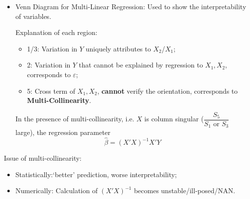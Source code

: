 \begin{itemize}[topsep=2pt,itemsep=2pt]
    \item Venn Diagram for Multi-Linear Regression: Used to show the interpretability of variables.
    
    \begin{center}
    \end{center}

    Explanation of each region:
    \begin{itemize}[topsep=2pt,itemsep=2pt]
        \item 1/3: Variation in $ Y $ uniquely attributes to $ X_2 $/$ X_1 $;
        \item 2: Variation in $ Y $ that cannot be explained by regression to $ X_1,X_2 $, corresponds to $ \varepsilon  $;
        \item 5: Cross term of $ X_1,X_2 $, \textbf{cannot} verify the orientation, corresponds to \textbf{Multi-Collinearity}.
    \end{itemize}

    In the presence of multi-collinearity, i.e. $ X $ is column singular ($ \dfrac{S_5}{S_1\text{ or }S_3} $ large), the regression parameter
    \begin{equation}
        \hat{\beta }=(X'X)^{-1}X'Y
    \end{equation}

    
    
   
\end{itemize}

     Issue of multi-collinearity: 
    \begin{itemize}[topsep=2pt,itemsep=2pt]
        \item Statistically:`better' prediction, worse interpretability;
        \item Numerically: Calculation of $ (X'X)^{-1} $ becomes unstable/ill-posed/NAN.
    \end{itemize}

